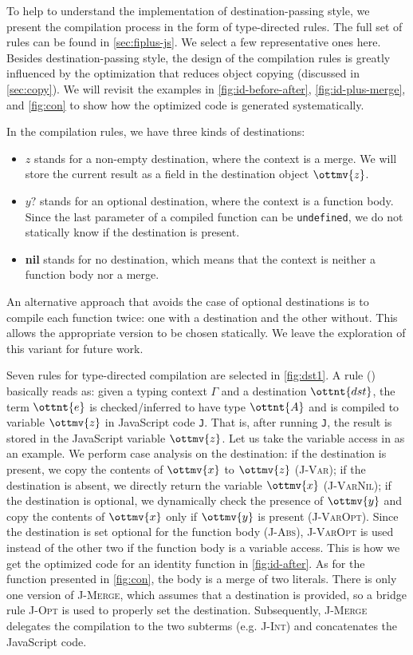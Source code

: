 To help to understand the implementation of destination-passing style, we
present the compilation process in the form of type-directed rules. The full set
of rules can be found in \autoref{sec:fiplus-js}. We select a few representative
ones here. Besides destination-passing style, the design of the compilation
rules is greatly influenced by the optimization that reduces object copying
(discussed in \autoref{sec:copy}). We will revisit the examples in
\autoref{fig:id-before-after}, \autoref{fig:id-plus-merge}, and
\autoref{fig:con} to show how the optimized code is generated systematically.

In the compilation rules, we have three kinds of destinations:
\begin{itemize}
\item $z$ stands for a non-empty destination, where the context is a merge. We
      will store the current result as a field in the destination object
      $\ottmv{z}$.
\item $y?$ stands for an optional destination, where the context is a function
      body. Since the last parameter of a compiled function can be
      \lstinline{undefined}, we do not statically know if the destination is
      present.
\item \textbf{nil} stands for no destination, which means that the context is
      neither a function body nor a merge.
\end{itemize}
An alternative approach that avoids the case of optional destinations is to
compile each function twice: one with a destination and the other without. This
allows the appropriate version to be chosen statically. We leave the exploration
of this variant for future work.

Seven rules for type-directed compilation are selected in \autoref{fig:dst1}. A
rule (\compilation) basically reads as: given a typing context $\Gamma$ and a
destination $\ottnt{dst}$, the \fiplus term $\ottnt{e}$ is checked/inferred to have
type $\ottnt{A}$ and is compiled to variable $\ottmv{z}$ in JavaScript code
\texttt{J}. That is, after running \texttt{J}, the result is stored in the
JavaScript variable $\ottmv{z}$. Let us take the variable access in \fiplus as
an example. We perform case analysis on the destination: if the destination is
present, we copy the contents of $\ottmv{x}$ to $\ottmv{z}$ (\textsc{J-Var}); if
the destination is absent, we directly return the variable $\ottmv{x}$
(\textsc{J-VarNil}); if the destination is optional, we dynamically check the
presence of $\ottmv{y}$ and copy the contents of $\ottmv{x}$ only if $\ottmv{y}$
is present (\textsc{J-VarOpt}). Since the destination is set optional for the
function body (\textsc{J-Abs}), \textsc{J-VarOpt} is used instead of the other
two if the function body is a variable access. This is how we get the optimized
code for an identity function in \autoref{fig:id-after}. As for the function
presented in \autoref{fig:con}, the body is a merge of two literals. There is
only one version of \textsc{J-Merge}, which assumes that a destination is
provided, so a bridge rule \textsc{J-Opt} is used to properly set the
destination. Subsequently, \textsc{J-Merge} delegates the compilation to the two
subterms (e.g. \textsc{J-Int}) and concatenates the JavaScript code.

